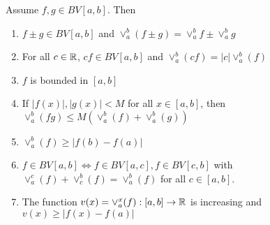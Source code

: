 \documentclass[x11names,reqno,14pt]{extarticle}
\begin{document}
Assume $f, g \in BV[a, b]$. Then 
\begin{enumerate}

\item $f\pm g \in BV[a, b]$ and $\vee_a^b(f\pm g) = \vee_a^bf\pm\vee_a^bg$

\item For all $c \in \mathbb{R}$, $cf \in BV[a,b]$ and $\vee_a^b(cf) = |c|\vee_a^b(f)$

\item $f$ is bounded in $[a, b]$ 

\item If $|f(x)|, |g(x)| < M$ for all $x\in[a, b]$, then $\vee_a^b(fg) \leq M(\vee_a^b(f) + \vee_a^b(g))$ 

\item $\vee_a^b(f) \geq |f(b) - f(a)|$

\item $f \in BV[a, b] \iff f \in BV[a,c], f \in BV[c, b]$ with $\vee_a^c(f) + \vee_c^b(f) = \vee_a^b(f)$ for all $c\in[a, b]$. 

\item The function $v(x) = \vee_a^x(f):[a, b]\to \mathbb{R}$ is increasing and $v(x) \geq |f(x) - f(a)|$

\end{enumerate}

\proof
\end{document}
